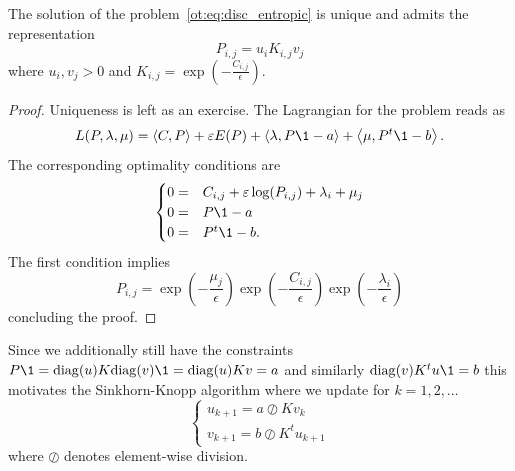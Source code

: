 \begin{lemma}
    The solution of the problem~\eqref{ot:eq:disc_entropic} is unique and admits the representation
    \begin{equation}
        P_{i,j} = u_i K_{i,j}v_j
    \end{equation}
    where $u_i,v_j>0$ and $K_{i,j}=\exp\left(-\frac{C_{i,j}}{\epsilon}\right)$.
\end{lemma}
\begin{proof}
    Uniqueness is left as an exercise.
    The Lagrangian for the problem reads as
    \begin{equation}
        L(P,\lambda,\mu)
        = \inner{C}{P} + \epsilon E(P) + \inner{\lambda}{P\1-a} + \inner{\mu}{P^t\1-b}.
    \end{equation}
    The corresponding optimality conditions are
    \begin{equation}
        \begin{cases}
            0 =& C_{i,j} + \epsilon\log(P_{i,j}) + \lambda_i + \mu_j\\
            0 =& P\1-a\\
            0 =& P^t\1-b.
        \end{cases}
    \end{equation}
    The first condition implies 
    \begin{equation}
        P_{i,j} = \exp\left(-\frac{\mu_j}{\epsilon}\right)\exp\left(-\frac{C_{i,j}}{\epsilon}\right)\exp\left(-\frac{\lambda_i}{\epsilon}\right)
    \end{equation}
    concluding the proof.
\end{proof}
Since we additionally still have the constraints $P\1 = \diag(u) K \diag(v)\1 = \diag(u) K v = a$ and similarly $\diag(v)K^t u\1 = b$ this motivates the Sinkhorn-Knopp algorithm where we update for $k=1,2,\dots$
\begin{equation}
    \begin{cases}
        u_{k+1} = a \oslash Kv_k\\
        v_{k+1} = b\oslash K^t u_{k+1}
    \end{cases}
\end{equation}
where $\oslash$ denotes element-wise division.
